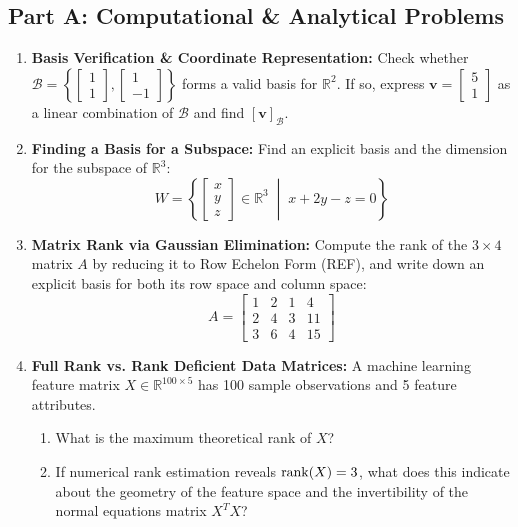 \subsection*{Part A: Computational \& Analytical Problems}
\begin{enumerate}
\item \textbf{Basis Verification \& Coordinate Representation:} Check whether $\mathcal{B} = \left\{ \begin{bmatrix} 1 \\ 1 \end{bmatrix}, \begin{bmatrix} 1 \\ -1 \end{bmatrix} \right\}$ forms a valid basis for $\mathbb{R}^2$. If so, express $\mathbf{v} = \begin{bmatrix} 5 \\ 1 \end{bmatrix}$ as a linear combination of $\mathcal{B}$ and find $[\mathbf{v}]_\mathcal{B}$.

\item \textbf{Finding a Basis for a Subspace:} Find an explicit basis and the dimension for the subspace of $\mathbb{R}^3$:
\begin{equation*}
W = \left\{ \begin{bmatrix} x \\ y \\ z \end{bmatrix} \in \mathbb{R}^3 \;\middle|\; x + 2y - z = 0 \right\}
\end{equation*}

\item \textbf{Matrix Rank via Gaussian Elimination:} Compute the rank of the $3 \times 4$ matrix $A$ by reducing it to Row Echelon Form (REF), and write down an explicit basis for both its row space and column space:
\begin{equation*}
A = \begin{bmatrix} 1 & 2 & 1 & 4 \\ 2 & 4 & 3 & 11 \\ 3 & 6 & 4 & 15 \end{bmatrix}
\end{equation*}

\item \textbf{Full Rank vs. Rank Deficient Data Matrices:} A machine learning feature matrix $X \in \mathbb{R}^{100 \times 5}$ has 100 sample observations and 5 feature attributes.
\begin{enumerate}
    \item What is the maximum theoretical rank of $X$?
    \item If numerical rank estimation reveals $\operatorname{rank}(X) = 3$, what does this indicate about the geometry of the feature space and the invertibility of the normal equations matrix $X^T X$?
\end{enumerate}


\end{enumerate}
